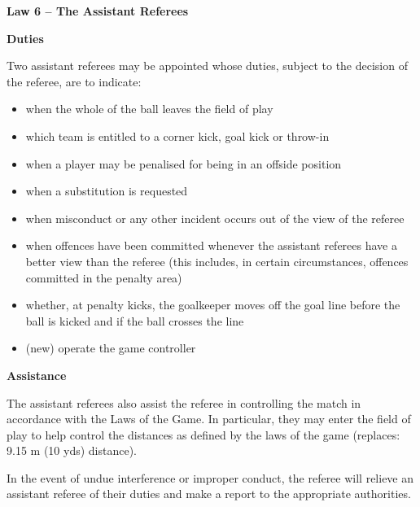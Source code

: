 \clearpage
\sffamily
{\bfseries\color[rgb]{0.4,0.4,0.4}
Law 6 -- The Assistant Referees}


\bigskip

{\bfseries Duties}

\headlinebox

Two assistant referees may be appointed whose duties, subject to the decision of the referee, are to indicate:

\begin{itemize}
\item when the whole of the ball leaves the field of play
\item which team is entitled to a corner kick, goal kick or throw-in
\item when a player may be penalised for being in an offside position 
\item when a substitution is requested
\item when misconduct or any other incident occurs out of the view of the referee 
\item when offences have been committed whenever the assistant referees have a better view than the referee (this includes, in certain circumstances, offences committed in the penalty area) 
\item whether, at penalty kicks, the goalkeeper moves off the goal line before the ball is kicked and if the ball crosses the line
\item (new) operate the game controller
\end{itemize}

{\bfseries Assistance}

\headlinebox

The assistant referees also assist the referee in controlling the match in accordance with the Laws of the Game. In particular, they may enter the field of play to help control the distances as defined by the laws of the game 
\textcolor[rgb]{0.4,0.4,0.4}{(replaces: 9.15 m (10 yds)
distance)}.

\bigskip

In the event of undue interference or improper conduct, the referee will relieve an assistant referee of their duties and make a report to the appropriate authorities.